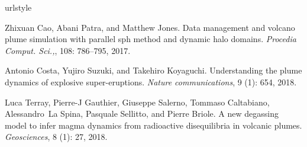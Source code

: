 \documentclass{article}
\begin{document}
\begin{thebibliography}{3}
\providecommand{\natexlab}[1]{#1}
\providecommand{\url}[1]{\texttt{#1}}
\expandafter\ifx\csname urlstyle\endcsname\relax
  \providecommand{\doi}[1]{doi: #1}\else
  \providecommand{\doi}{doi: \begingroup \urlstyle{rm}\Url}\fi

Zhixuan Cao, Abani Patra, and Matthew Jones.
\newblock Data management and volcano plume simulation with parallel sph method
  and dynamic halo domains.
\newblock \emph{Procedia Comput. Sci.,}, 108: 786--795, 2017.

Antonio Costa, Yujiro Suzuki, and Takehiro Koyaguchi.
\newblock Understanding the plume dynamics of explosive super-eruptions.
\newblock \emph{Nature communications}, 9 (1): 654, 2018.

Luca Terray, Pierre-J Gauthier, Giuseppe Salerno, Tommaso Caltabiano,
  Alessandro~La Spina, Pasquale Sellitto, and Pierre Briole.
\newblock A new degassing model to infer magma dynamics from radioactive
  disequilibria in volcanic plumes.
\newblock \emph{Geosciences}, 8 (1): 27, 2018.

\end{thebibliography}
%
%
\end{document}
